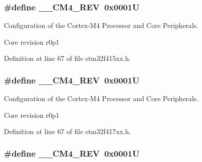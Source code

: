 \subsubsection[{\texorpdfstring{\+\_\+\+\_\+\+C\+M4\+\_\+\+R\+EV}{__CM4_REV}}]{\setlength{\rightskip}{0pt plus 5cm}\#define \+\_\+\+\_\+\+C\+M4\+\_\+\+R\+EV~0x0001U}\hypertarget{group___configuration__section__for___c_m_s_i_s_ga45a97e4bb8b6ce7c334acc5f45ace3ba}{}\label{group___configuration__section__for___c_m_s_i_s_ga45a97e4bb8b6ce7c334acc5f45ace3ba}


Configuration of the Cortex-\/\+M4 Processor and Core Peripherals. 

Core revision r0p1 

Definition at line 67 of file stm32f415xx.\+h.

\subsubsection[{\texorpdfstring{\+\_\+\+\_\+\+C\+M4\+\_\+\+R\+EV}{__CM4_REV}}]{\setlength{\rightskip}{0pt plus 5cm}\#define \+\_\+\+\_\+\+C\+M4\+\_\+\+R\+EV~0x0001U}\hypertarget{group___configuration__section__for___c_m_s_i_s_ga45a97e4bb8b6ce7c334acc5f45ace3ba}{}\label{group___configuration__section__for___c_m_s_i_s_ga45a97e4bb8b6ce7c334acc5f45ace3ba}


Configuration of the Cortex-\/\+M4 Processor and Core Peripherals. 

Core revision r0p1 

Definition at line 67 of file stm32f417xx.\+h.

\subsubsection[{\texorpdfstring{\+\_\+\+\_\+\+C\+M4\+\_\+\+R\+EV}{__CM4_REV}}]{\setlength{\rightskip}{0pt plus 5cm}\#define \+\_\+\+\_\+\+C\+M4\+\_\+\+R\+EV~0x0001U}\hypertarget{group___configuration__section__for___c_m_s_i_s_ga45a97e4bb8b6ce7c334acc5f45ace3ba}{}\label{group___configuration__section__for___c_m_s_i_s_ga45a97e4bb8b6ce7c334acc5f45ace3ba}


